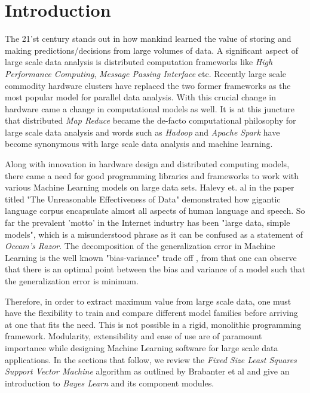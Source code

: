 \documentclass[
    ,final            %
  ]
  {aipproc}
\begin{document}
\maketitle


\section{Introduction}

The 21'st century stands out in how mankind learned the value of storing and making predictions/decisions from large volumes of data. A significant aspect of large scale data analysis is distributed computation frameworks like \textit{High Performance Computing}, \textit{Message Passing Interface} etc. Recently large scale commodity hardware clusters have replaced the two former frameworks as the most popular model for parallel data analysis. With this crucial change in hardware came a change in computational models as well. It is at this juncture that distributed \textit{Map Reduce} became the de-facto computational philosophy for large scale data analysis and  words such as \textit{Hadoop} and \textit{Apache Spark} have become synonymous with large scale data analysis and machine learning.

Along with innovation in hardware design and distributed computing models, there came a need for good programming libraries and frameworks to work with various Machine Learning models on large data sets. Halevy et. al \cite{10.1109/MIS.2009.36} in the paper titled "The Unreasonable Effectiveness of Data" demonstrated how gigantic language corpus encapsulate almost all aspects of human language and speech. So far the prevalent 'motto' in the Internet industry has been "large data, simple models", which is a misunderstood phrase as it can be confused as a statement of \textit{Occam's Razor}. The decomposition of the generalization error in Machine Learning is the well known "bias-variance" trade off \cite{Valentini2004}, from that one can observe that there is an optimal point between the bias and variance of a model such that the generalization error is minimum.

Therefore, in order to extract maximum value from large scale data, one must have the flexibility to train and compare different model families before arriving at one that fits the need. This is not possible in a rigid, monolithic programming framework. Modularity, extensibility and ease of use are of paramount importance while designing Machine Learning software for large scale data applications. In the sections that follow, we review the \textit{Fixed Size Least Squares Support Vector Machine} algorithm as outlined by Brabanter et al \cite{DeBrabanter2010} and give an introduction to \textit{Bayes Learn} and its component modules.
\end{document}

